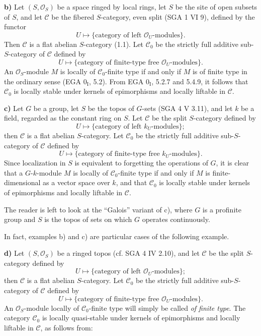 \textbf{b)} Let \((S,\mathcal O_S)\) be a space ringed by local rings, let \(S\) be the site of open subsets of \(S\), and let \(\mathcal C\) be the fibered \(S\)-category, even split (SGA 1 VI 9), defined by the functor
\[
  U\longmapsto \{\text{category of left }\mathcal O_U\text{-modules}\}.
\]
Then \(\mathcal C\) is a flat abelian \(S\)-category (1.1). Let \(\mathcal C_0\) be the strictly full additive sub-\(S\)-category of \(\mathcal C\) defined by
\[
  U\longmapsto \{\text{category of finite-type free }\mathcal O_U\text{-modules}\}.
\]
An \(\mathcal O_S\)-module \(M\) is locally of \(\mathcal C_0\)-finite type if and only if \(M\) is of finite type in the ordinary sense (EGA \(0_{\mathrm I}\), 5.2). From EGA \(0_{\mathrm I}\), 5.2.7 and 5.4.9, it follows that \(\mathcal C_0\) is locally stable under kernels of epimorphisms and locally liftable in \(\mathcal C\).

\textbf{c)} Let \(G\) be a group, let \(S\) be the topos of \(G\)-sets (SGA 4 V 3.11), and let \(k\) be a field, regarded as the constant ring on \(S\). Let \(\mathcal C\) be the split \(S\)-category defined by
\[
  U\longmapsto \{\text{category of left }k_U\text{-modules}\};
\]
then \(\mathcal C\) is a flat abelian \(S\)-category. Let \(\mathcal C_0\) be the strictly full additive sub-\(S\)-category of \(\mathcal C\) defined by
\[
  U\longmapsto \{\text{category of finite-type free }k_U\text{-modules}\}.
\]
Since localization in \(S\) is equivalent to forgetting the operations of \(G\), it is clear that a \(G\)-\(k\)-module \(M\) is locally of \(\mathcal C_0\)-finite type if and only if \(M\) is finite-dimensional as a vector space over \(k\), and that \(\mathcal C_0\) is locally stable under kernels of epimorphisms and locally liftable in \(\mathcal C\).

The reader is left to look at the ``Galois'' variant of c), where \(G\) is a profinite group and \(S\) is the topos of sets on which \(G\) operates continuously.

In fact, examples b) and c) are particular cases of the following example.

\textbf{d)} Let \((S,\mathcal O_S)\) be a ringed topos (cf. SGA 4 IV 2.10), and let \(\mathcal C\) be the split \(S\)-category defined by
\[
  U\longmapsto \{\text{category of left }\mathcal O_U\text{-modules}\};
\]
then \(\mathcal C\) is a flat abelian \(S\)-category. Let \(\mathcal C_0\) be the strictly full additive sub-\(S\)-category of \(\mathcal C\) defined by
\[
  U\longmapsto \{\text{category of finite-type free }\mathcal O_U\text{-modules}\}.
\]
An \(\mathcal O_S\)-module locally of \(\mathcal C_0\)-finite type will simply be called \emph{of finite type}. The category \(\mathcal C_0\) is locally quasi-stable under kernels of epimorphisms and locally liftable in \(\mathcal C\), as follows from:

